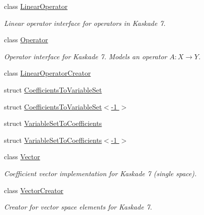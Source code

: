 \begin{DoxyCompactItemize}
class \hyperlink{classSpacy_1_1Kaskade_1_1LinearOperator}{Linear\-Operator}
\begin{DoxyCompactList}\small\item\em Linear operator interface for operators in Kaskade 7. \end{DoxyCompactList}\item 
class \hyperlink{classSpacy_1_1Kaskade_1_1Operator}{Operator}
\begin{DoxyCompactList}\small\item\em Operator interface for Kaskade 7. Models an operator $A:X\rightarrow Y$. \end{DoxyCompactList}\item 
class \hyperlink{classSpacy_1_1Kaskade_1_1LinearOperatorCreator}{Linear\-Operator\-Creator}
\item 
struct \hyperlink{structSpacy_1_1Kaskade_1_1CoefficientsToVariableSet}{Coefficients\-To\-Variable\-Set}
\item 
struct \hyperlink{structSpacy_1_1Kaskade_1_1CoefficientsToVariableSet_3-1_01_4}{Coefficients\-To\-Variable\-Set$<$-\/1 $>$}
\item 
struct \hyperlink{structSpacy_1_1Kaskade_1_1VariableSetToCoefficients}{Variable\-Set\-To\-Coefficients}
\item 
struct \hyperlink{structSpacy_1_1Kaskade_1_1VariableSetToCoefficients_3-1_01_4}{Variable\-Set\-To\-Coefficients$<$-\/1 $>$}
\item 
class \hyperlink{classSpacy_1_1Kaskade_1_1Vector}{Vector}
\begin{DoxyCompactList}\small\item\em Coefficient vector implementation for Kaskade 7 (single space). \end{DoxyCompactList}\item 
class \hyperlink{classSpacy_1_1Kaskade_1_1VectorCreator}{Vector\-Creator}
\begin{DoxyCompactList}\small\item\em Creator for vector space elements for Kaskade 7. \end{DoxyCompactList}\end{DoxyCompactItemize}
